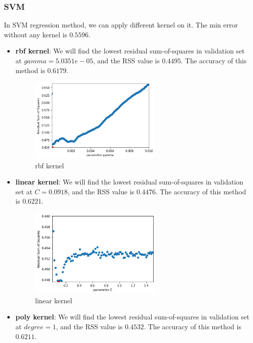 \documentclass{article}
\begin{document}
\subsubsection{SVM}
In SVM regression method, we can apply different kernel on it. The min error without any kernel is $0.5596$.
\begin{itemize}
	\item \textbf{rbf kernel}: We will find the lowest residual sum-of-squares in validation set at $gamma =5.0351e-05$, and the RSS value is $0.4495$. The accuracy of this method is $0.6179$.
	\begin{figure}[h]
		\centering
		\includegraphics[width=6.5cm]{svm1.jpg}
		\caption{rbf kernel}
	\end{figure}
	\item \textbf{linear kernel}: We will find the lowest residual sum-of-squares in validation set at $C=0.0918$, and the RSS value is $0.4476$. The accuracy of this method is $0.6221$.
	\begin{figure}[h]
		\centering
		\includegraphics[width=6.5cm]{svm2.jpg}
		\caption{linear kernel}
	\end{figure}
	\item \textbf{poly kernel}: We will find the lowest residual sum-of-squares in validation set at $degree=1$, and the RSS value is $0.4532$. The accuracy of this method is $0.6211$.
\end{itemize}
\end{document}
